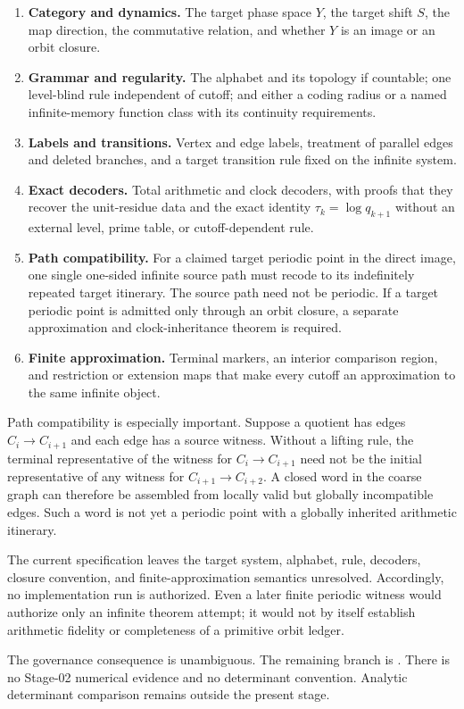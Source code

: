 \begin{enumerate}
  \item \textbf{Category and dynamics.}  The target phase space $Y$, the
  target shift $S$, the map direction, the commutative relation, and whether
  $Y$ is an image or an orbit closure.

  \item \textbf{Grammar and regularity.}  The alphabet and its topology if
  countable; one level-blind rule independent of cutoff; and either a coding
  radius or a named infinite-memory function class with its continuity
  requirements.

  \item \textbf{Labels and transitions.}  Vertex and edge labels, treatment
  of parallel edges and deleted branches, and a target transition rule fixed
  on the infinite system.

  \item \textbf{Exact decoders.}  Total arithmetic and clock decoders, with
  proofs that they recover the unit-residue data and the exact identity
  $\tau_k=\log q_{k+1}$ without an external level, prime table, or
  cutoff-dependent rule.

  \item \textbf{Path compatibility.}  For a claimed target periodic point in
  the direct image, one single one-sided infinite source path must recode to
  its indefinitely repeated target itinerary.  The source path need not be
  periodic.  If a target periodic point is admitted only through an orbit
  closure, a separate approximation and clock-inheritance theorem is
  required.

  \item \textbf{Finite approximation.}  Terminal markers, an interior
  comparison region, and restriction or extension maps that make every
  cutoff an approximation to the same infinite object.
\end{enumerate}

Path compatibility is especially important.  Suppose a quotient has edges
$C_i\to C_{i+1}$ and each edge has a source witness.  Without a lifting rule,
the terminal representative of the witness for $C_i\to C_{i+1}$ need not be
the initial representative of any witness for $C_{i+1}\to C_{i+2}$.  A
closed word in the coarse graph can therefore be assembled from locally
valid but globally incompatible edges.  Such a word is not yet a periodic
point with a globally inherited arithmetic itinerary.

The current specification leaves the target system, alphabet, rule,
decoders, closure convention, and finite-approximation semantics unresolved.
Accordingly, no implementation run is authorized.  Even a later finite
periodic witness would authorize only an infinite theorem attempt; it would
not by itself establish arithmetic fidelity or completeness of a primitive
orbit ledger.

The governance consequence is unambiguous.  The remaining branch is
\notestable.  There is no Stage-02 numerical evidence and no determinant
convention.  Analytic determinant comparison remains outside the present
stage.
